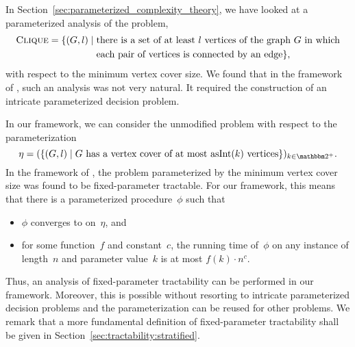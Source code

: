 \begin{example}
  In Section~\ref{sec:parameterized_complexity_theory}, we have looked at a parameterized analysis of the  problem,
  \begin{align*}
    \textnormal{\textsc{Clique}} = \{(G, l) \;|\; &\text{there is a set of at least $l$ vertices of the graph $G$ in which} \\
          &\text{each pair of vertices is connected by an edge}\},
  \end{align*}
  with respect to the minimum vertex cover size.
  We found that in the framework of \citeauthor{downey1999parameterized}, such an analysis was not very natural.
  It required the construction of an intricate parameterized decision problem.

  In our framework, we can consider the unmodified  problem with respect to the parameterization
  \begin{equation*}
    \eta \deq (\{(G, l) \st \text{$G$ has a vertex cover of at most $\asNat(k)$ vertices}\})_{k \in \binary^+}.
  \end{equation*}
  In the framework of \citeauthor{downey1999parameterized}, the  problem parameterized by the minimum vertex cover size was found to be fixed-parameter tractable.
  For our framework, this means that there is a parameterized procedure~$\phi$ such that
  \begin{itemize}
  \item $\phi$ converges to  on~$\eta$, and
  \item for some function~$f$ and constant~$c$, the running time of~$\phi$ on any instance of length~$n$ and parameter value~$k$ is at most $f(k) \cdot n^c$.
  \end{itemize}
  Thus, an analysis of fixed-parameter tractability can be performed in our framework.
  Moreover, this is possible without resorting to intricate parameterized decision problems and the parameterization can be reused for other problems.
  We remark that a more fundamental definition of fixed-parameter tractability shall be given in Section~\ref{sec:tractability:stratified}.
\end{example}

